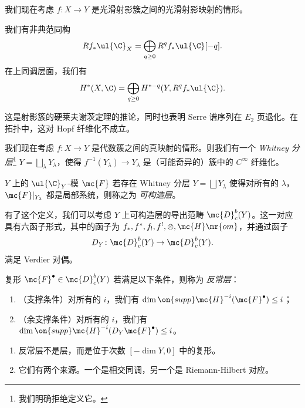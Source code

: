 我们现在考虑 \(f \colon X \to Y\) 是光滑射影簇之间的光滑射影映射的情形。

\begin{thm}
    我们有非典范同构
    \[ R f_* \ul{\C}_X = \bigoplus_{q \geq 0} R^q f_* \ul{\C}[-q]. \]
    在上同调层面，我们有
    \[ H^*(X, \C) = \bigoplus_{q \geq 0} H^{*-q}(Y, R^q f_* \ul{\C}). \]
\end{thm}

这是射影簇的硬莱夫谢茨定理的推论，同时也表明 Serre 谱序列在 \(E_2\) 页退化。在拓扑中，这对 Hopf 纤维化不成立。

我们现在考虑 \(f \colon X \to Y\) 是代数簇之间的真映射的情形。则我们有一个 \textit{Whitney 分层}\footnote{我们明确拒绝定义它。} \(Y = \bigsqcup_{\lambda} Y_{\lambda}\)，使得 \(f^{-1}(Y_{\lambda}) \to Y_{\lambda}\) 是（可能奇异的）簇中的 \(C^{\infty}\) 纤维化。

\begin{defn}
    \(Y\) 上的 \(\ul{\C}_Y\)-模 \(\mc{F}\) 若存在 Whitney 分层 \(Y = \bigsqcup Y_{\lambda}\) 使得对所有的 \(\lambda\)，\(\mc{F}|_{Y_{\lambda}}\) 都是局部系统，则称之为 \textit{可构造层}。
\end{defn}

有了这个定义，我们可以考虑 \(Y\) 上可构造层的导出范畴 \(\mc{D}_c^b(Y)\)。这一对应具有六函子形式，其中的函子为 \(f_*, f^*, f_!, f^!, \otimes, \mc{H}\mr{om}\)，并通过函子
\[ D_Y \colon \mc{D}_c^b(Y) \to \mc{D}_c^b(Y). \]
满足 Verdier 对偶。

\begin{defn}
    复形 \(\mc{F}^{\bullet} \in \mc{D}_c^b(Y)\) 若满足以下条件，则称为 \textit{反常层}：
    \begin{enumerate}
        \item （支撑条件）对所有的 \(i\)，我们有 \(\dim \on{supp} \mc{H}^{-i}(\mc{F}^{\bullet}) \leq i\)；
        \item （余支撑条件）对所有的 \(i\)，我们有 \(\dim \on{supp} \mc{H}^{-i}(D_Y \mc{F}^{\bullet}) \leq i\)。
    \end{enumerate}
\end{defn}

\begin{rmks}\leavevmode
    \begin{enumerate}
        \item 反常层不是层，而是位于次数 \([-\dim Y, 0]\) 中的复形。
        \item 它们有两个来源。一个是相交同调，另一个是 Riemann-Hilbert 对应。
    \end{enumerate}
\end{rmks}

